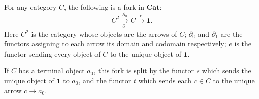 For any category $C$, the following is a fork in $\mathbf{Cat}$:
$$C^2 \xrightarrow[\partial_1]{\partial_0} C \xrightarrow{e} \mathbf{1}.$$
Here $C^2$ is the category whose objects are the arrows of $C$; $\partial_0$ and $\partial_1$ are the functors assigning to each arrow its domain and codomain respectively; $e$ is the functor sending every object of $C$ to the unique object of $\mathbf{1}$.

If $C$ has a terminal object $a_0$, this fork is split by the functor $s$ which sends the unique object of $\mathbf{1}$ to $a_0$, and the functor $t$ which sends each $c \in C$ to the unique arrow $c \to a_0$.
